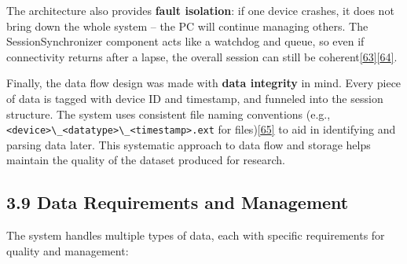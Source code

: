 \documentclass[12pt,a4paper]{article}
\begin{document}
The architecture also provides \textbf{fault isolation}: if one device crashes, it does not bring down the whole system -- the PC will continue managing others. The SessionSynchronizer component acts like a watchdog and queue, so even if connectivity returns after a lapse, the overall session can still be coherent\href{https://github.com/buccancs/bucika_gsr/blob/7048f7f6a7536f5cd577ed2184800d3dad97fd08/PythonApp/session/session_synchronizer.py\#L169-L178}{{[}63{]}}\href{https://github.com/buccancs/bucika_gsr/blob/7048f7f6a7536f5cd577ed2184800d3dad97fd08/PythonApp/session/session_synchronizer.py\#L179-L187}{{[}64{]}}.

Finally, the data flow design was made with \textbf{data integrity} in mind. Every piece of data is tagged with device ID and timestamp, and funneled into the session structure. The system uses consistent file naming conventions (e.g., \passthrough{\lstinline!<device>\_<datatype>\_<timestamp>.ext!} for files)\href{https://github.com/buccancs/bucika_gsr/blob/7048f7f6a7536f5cd577ed2184800d3dad97fd08/PythonApp/session/session_manager.py\#L20-L28}{{[}65{]}} to aid in identifying and parsing data later. This systematic approach to data flow and storage helps maintain the quality of the dataset produced for research.

\subsection{3.9 Data Requirements and Management}\label{data-requirements-and-management}

The system handles multiple types of data, each with specific requirements for quality and management:
\end{document}

